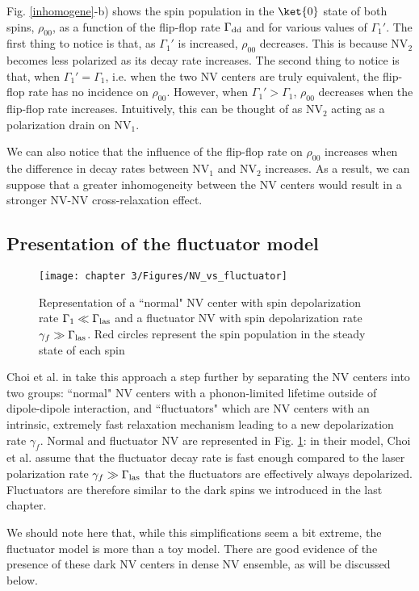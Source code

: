\documentclass[a4paper, 11pt]{report}
\begin{document}
Fig. \ref{inhomogene}-b) shows the spin population in the $\ket{0}$ state of both spins, $\rho_{00}$, as a function of the flip-flop rate $\Gamma_{\rm dd}$ and for various values of $\Gamma_1'$. The first thing to notice is that, as $\Gamma_1'$ is increased,  $\rho_{00}$ decreases. This is because NV$_2$ becomes less polarized as its decay rate increases. The second thing to notice is that, when $\Gamma_1'=\Gamma_1$, i.e. when the two NV centers are truly equivalent, the flip-flop rate has no incidence on  $\rho_{00}$. However, when $\Gamma_1'>\Gamma_1$,  $\rho_{00}$ decreases when the flip-flop rate increases. Intuitively, this can be thought of as NV$_2$ acting as a polarization drain on NV$_1$. 

We can also notice that the influence of the flip-flop rate on $\rho_{00}$ increases when the difference in decay rates between NV$_1$ and NV$_2$ increases. As a result, we can suppose that a greater inhomogeneity between the NV centers would result in a stronger NV-NV cross-relaxation effect.


\subsection{Presentation of the fluctuator model}
\begin{figure}[h]
\centering
\texttt{[image: chapter 3/Figures/NV\_vs\_fluctuator]}
\caption{Representation of a ``normal" NV center with spin depolarization rate $\Gamma_1 \ll \Gamma_{\rm las}$ and a fluctuator NV with spin depolarization rate $\gamma_f \gg \Gamma_{\rm las}$. Red circles represent the spin population in the steady state of each spin}
\label{NV vs fluct}
\end{figure}
Choi et al. in \citep{choi2017depolarization} take this approach a step further by separating the NV centers into two groups: ``normal" NV centers with a phonon-limited lifetime outside of dipole-dipole interaction, and ``fluctuators" which are NV centers with an intrinsic, extremely fast relaxation mechanism leading to a new depolarization rate $\gamma_f$. Normal and fluctuator NV are represented in Fig. \ref{NV vs fluct}: in their model, Choi et al. assume that the fluctuator decay rate is fast enough compared to the laser polarization rate $\gamma_f \gg \Gamma_{\rm las}$ that the fluctuators are effectively always depolarized. Fluctuators are therefore similar to the dark spins we introduced in the last chapter.

We should note here that, while this simplifications seem a bit extreme, the fluctuator model is more than a toy model. There are good evidence of the presence of these dark NV centers in dense NV ensemble, as will be discussed below.
\end{document}
